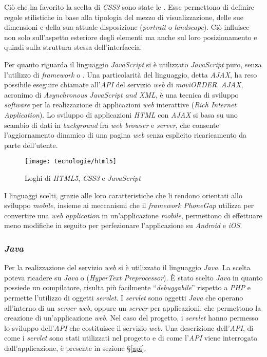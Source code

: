 Ciò che ha favorito la scelta di \textit{CSS3} sono state le . Esse permettono di definire regole stilistiche in base alla tipologia del mezzo di visualizzazione, delle sue dimensioni e della sua attuale disposizione (\textit{portrait} o \textit{landscape}). Ciò influisce non solo sull'aspetto esteriore degli elementi ma anche sul loro posizionamento e quindi sulla struttura stessa dell'interfaccia.

Per quanto riguarda il linguaggio \textit{JavaScript} si è utilizzato \textit{JavaScript} puro, senza l'utilizzo di \textit{framework} o . Una particolarità del linguaggio, detta \textit{AJAX}, ha reso possibile eseguire chiamate all'\textit{API} del servizio \textit{web} di \textit{moviORDER}. \textit{AJAX}, acronimo di \textit{\textit{Asynchronous JavaScript and XML}}, è una tecnica di sviluppo \textit{software} per la realizzazione di applicazioni \textit{web} interattive (\textit{Rich Internet Application}). Lo sviluppo di applicazioni \textit{HTML} con \textit{AJAX} si basa su uno scambio di dati in \textit{background} fra \textit{web browser} e \textit{server}, che consente l'aggiornamento dinamico di una pagina \textit{web} senza esplicito ricaricamento da parte dell'utente.

\begin{figure}[!h] 
    \centering 
    	\texttt{[image: tecnologie/html5]}
    \caption{Loghi di \textit{HTML5}, \textit{CSS3} e \textit{JavaScript}}
\end{figure}

I linguaggi scelti, grazie alle loro caratteristiche che li rendono orientati allo sviluppo \textit{mobile}, insieme ai meccanismi che il \textit{framework PhoneGap} utilizza per convertire una \textit{web application} in un'applicazione \textit{mobile}, permettono di effettuare meno modifiche in seguito per perfezionare l'applicazione su \textit{Android} e \textit{iOS}.

\subsubsection{\textit{Java}}

Per la realizzazione del servizio \textit{web} si è utilizzato il linguaggio \textit{Java}. La scelta poteva ricadere su \textit{Java} o  (\textit{HyperText Preprocessor}). È stato scelto \textit{Java} in quanto possiede un compilatore, risulta più facilmente ``\textit{debuggabile}'' rispetto a \textit{PHP} e permette l'utilizzo di oggetti \textit{servlet}. I \textit{servlet} sono oggetti \textit{Java} che operano all'interno di un \textit{server web}, oppure un \textit{server} per applicazioni, che permettono la creazione di un'applicazione \textit{web}. Nel caso del progetto, i \textit{servlet} hanno permesso lo sviluppo dell'\textit{API} che costituisce il servizio \textit{web}. Una descrizione dell'\textit{API}, di come i \textit{servlet} sono stati utilizzati nel progetto e di come l'\textit{API} viene interrogata dall'applicazione, è presente in sezione §\ref{api}.

